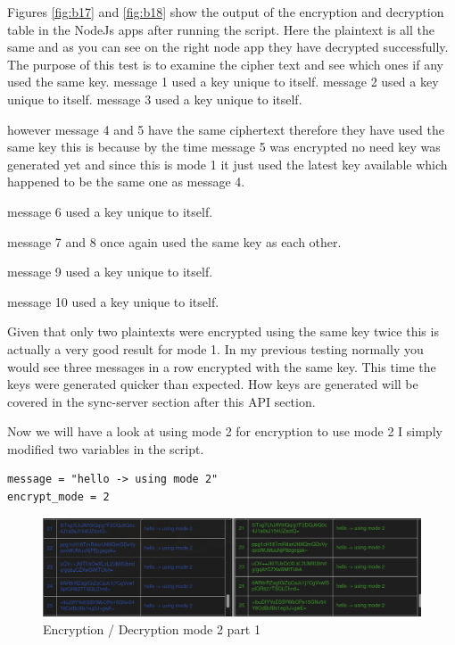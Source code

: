 Figures \ref{fig:b17} and \ref{fig:b18} show the output of the encryption and decryption table in the NodeJs apps after running the script. Here the plaintext is all the same and as you can see on the right node app they have decrypted successfully. The purpose of this test is to examine the cipher text and see which ones if any used the same key.
message 1 used a key unique to itself.
message 2 used a key unique to itself.
message 3 used a key unique to itself.

however message 4 and 5 have the same ciphertext therefore they have used the same key this is because by the time message 5 was encrypted no need key was generated yet and since this is mode 1 it just used the latest key available which happened to be the same one as message 4.

message 6 used a key unique to itself.

message 7 and 8 once again used the same key as each other.

message 9 used a key unique to itself.

message 10 used a key unique to itself.

Given that only two plaintexts were encrypted using the same key twice this is actually a very good result for mode 1. In my previous testing normally you would see three messages in a row encrypted with the same key. This time the keys were generated quicker than expected. How keys are generated will be covered in the sync-server section after this API section. 

Now we will have a look at using mode 2 for encryption to use mode 2 I simply modified two variables in the script.
\begin{lstlisting}
message = "hello -> using mode 2"
encrypt_mode = 2
\end{lstlisting}

\begin{figure}[!h]
  \centering
      \includegraphics[width=1\textwidth]{Figures/b19.png}
  \caption[Encryption / Decryption mode 2 part 1]{Encryption / Decryption mode 2 part 1}
  \label{fig:b19}
\end{figure}
\FloatBarrier

